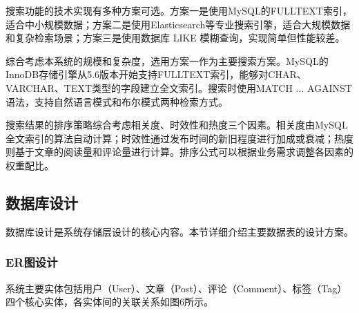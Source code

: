 \documentclass[UTF8,AutoFakeBold=1,AutoFakeSlant,zihao=-4]{SCAU}
\begin{document}
 搜索功能的技术实现有多种方案可选。方案一是使用MySQL的FULLTEXT索引，适合中小规模数据；方案二是使用Elasticsearch等专业搜索引擎，适合大规模数据和复杂检索场景；方案三是使用数据库 LIKE 模糊查询，实现简单但性能较差。

 综合考虑本系统的规模和复杂度，选用方案一作为主要搜索方案。MySQL的InnoDB存储引擎从5.6版本开始支持FULLTEXT索引，能够对CHAR、VARCHAR、TEXT类型的字段建立全文索引。搜索时使用MATCH ... AGAINST语法，支持自然语言模式和布尔模式两种检索方式。

 搜索结果的排序策略综合考虑相关度、时效性和热度三个因素。相关度由MySQL全文索引的算法自动计算；时效性通过发布时间的新旧程度进行加成或衰减；热度则基于文章的阅读量和评论量进行计算。排序公式可以根据业务需求调整各因素的权重配比。

 \subsection{数据库设计}

 数据库设计是系统存储层设计的核心内容。本节详细介绍主要数据表的设计方案。

\subsubsection{ER图设计}

系统主要实体包括用户（User）、文章（Post）、评论（Comment）、标签（Tag）四个核心实体，各实体间的关联关系如图6所示。
\end{document}
